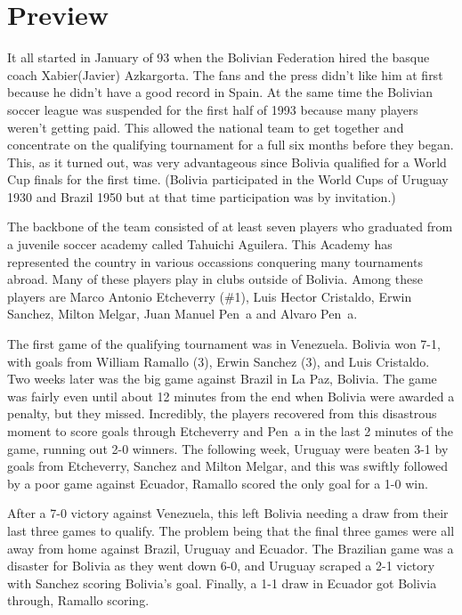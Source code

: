 \section{Preview}
It all started in January of 93 when the Bolivian Federation hired the basque 
coach Xabier(Javier) Azkargorta.  The fans and the press didn't like him at 
first because he didn't have a good record in Spain. At the same time the 
Bolivian soccer league was suspended for the first half of 1993 because many 
players weren't getting paid. This allowed the national team to get together
and concentrate on the qualifying tournament for a full six months before they
began. This, as it turned out, was very advantageous since Bolivia qualified 
for a World Cup finals for the first time. (Bolivia participated in the World 
Cups of Uruguay 1930 and Brazil 1950 but at that time participation was by 
invitation.)

The backbone of the team consisted of at least seven players who graduated from 
a juvenile soccer academy called Tahuichi Aguilera.  This Academy has 
represented the country in various occassions conquering many tournaments 
abroad.  Many of these players play in clubs outside of Bolivia. Among these 
players are Marco Antonio Etcheverry (\#1), Luis Hector Cristaldo, Erwin Sanchez,
Milton Melgar, Juan Manuel Pen~a and Alvaro Pen~a.

The first game of the qualifying tournament was in Venezuela. Bolivia won 7-1,
with goals from William Ramallo (3), Erwin Sanchez (3), and Luis Cristaldo. Two 
weeks later was the big game against Brazil in La Paz, Bolivia. The game was 
fairly even until about 12 minutes from the end when Bolivia were awarded a 
penalty, but they missed. Incredibly, the players recovered from this disastrous
moment to score goals through Etcheverry and Pen~a in the last 2 minutes of the 
game, running out 2-0 winners. The following week, Uruguay were beaten 3-1 by
goals from Etcheverry, Sanchez and Milton Melgar, and this was swiftly followed
by a poor game against Ecuador, Ramallo scored the only goal for a 1-0 win.

After a 7-0 victory against Venezuela, this left Bolivia needing a draw from 
their last three games to qualify. The problem being that the final three games
were all away from home against Brazil, Uruguay and Ecuador. The Brazilian game
was a disaster for Bolivia as they went down 6-0, and Uruguay scraped a 2-1
victory with Sanchez scoring Bolivia's goal. Finally, a 1-1 draw in Ecuador got
Bolivia through, Ramallo scoring.

